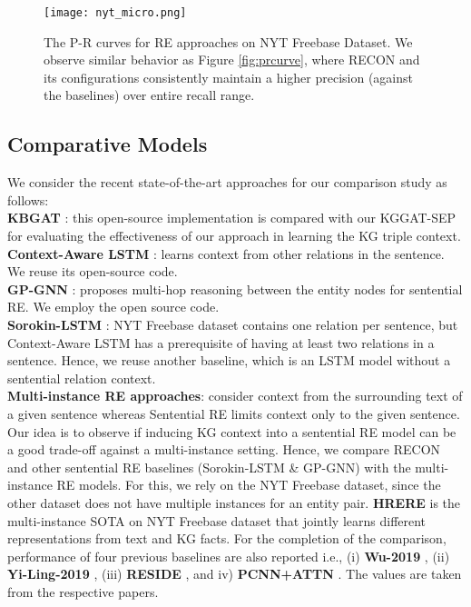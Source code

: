 \documentclass[sigconf]{acmart}
\begin{document}
\begin{figure}[h!]
  \texttt{[image: nyt\_micro.png]}
  \caption{The P-R curves for RE approaches on NYT Freebase Dataset. We observe similar behavior as Figure \ref{fig:prcurve}, where RECON and its configurations consistently maintain a higher precision (against the baselines) over entire recall range.}
  \label{fig:nyt_micro}
\end{figure}


\subsection{Comparative Models}
We consider the recent state-of-the-art approaches for our comparison study as follows:\\
\textbf{KBGAT} \cite{DBLP:conf/acl/NathaniCSK19}: this open-source implementation is compared with our KGGAT-SEP for evaluating the effectiveness of our approach in learning the KG triple context.\\
\textbf{Context-Aware LSTM} \cite{DBLP:conf/emnlp/SorokinG17}: learns context from other relations in the sentence. We reuse its open-source code.\\
\textbf{GP-GNN} \cite{DBLP:conf/acl/ZhuLLFCS19}: proposes multi-hop reasoning between the entity nodes for sentential RE. We employ the open source code.\\
\textbf{Sorokin-LSTM} \cite{DBLP:conf/emnlp/SorokinG17}: NYT Freebase dataset contains one relation per sentence, but Context-Aware LSTM has a prerequisite of having at least two relations in a sentence. Hence, we reuse another baseline, which is an LSTM model without a sentential relation context.\\
\textbf{Multi-instance RE approaches}:
consider context from the surrounding text of a given sentence whereas Sentential RE limits context only to the given sentence.
Our idea is to observe if inducing KG context into a sentential RE model can be a good trade-off against a multi-instance setting.
Hence, we compare RECON and other sentential RE baselines (Sorokin-LSTM \& GP-GNN) with the  multi-instance RE models. For this, we rely on the NYT Freebase dataset, since the other dataset does not have multiple instances for an entity pair. \textbf{HRERE} \cite{DBLP:conf/naacl/XuB19} is the multi-instance SOTA on NYT Freebase dataset that jointly learns different representations from text and KG facts. For the completion of the comparison, performance of four previous baselines are also reported i.e., (i) \textbf{Wu-2019} \cite{DBLP:conf/aaai/WuFZ19}, (ii) \textbf{Yi-Ling-2019} \cite{DBLP:conf/naacl/YeL19}, (iii) \textbf{RESIDE} \cite{DBLP:conf/emnlp/VashishthJPBT18}, and iv) \textbf{PCNN+ATTN} \cite{lin2016neural}. The values are taken from the respective papers.
\end{document}
